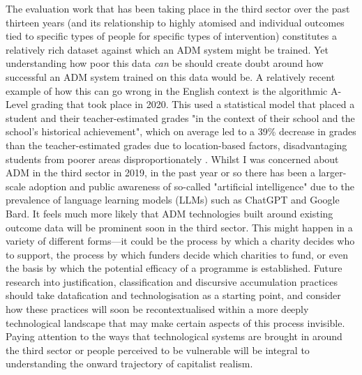 The evaluation work that has been taking place in the third sector over the past thirteen years (and its relationship to highly atomised and individual outcomes tied to specific types of people for specific types of intervention) constitutes a relatively rich dataset against which an ADM system might be trained. Yet understanding how poor this data \textit{can} be should create doubt around how successful an ADM system trained on this data would be. A relatively recent example of how this can go wrong in the English context is the algorithmic A-Level grading that took place in 2020. This used a statistical model that placed a student and their teacher-estimated grades "in the context of their school and the school’s historical achievement", which on average led to a 39\% decrease in grades than the teacher-estimated grades due to location-based factors, disadvantaging students from poorer areas disproportionately \citep[p. 608]{mead_contested_2023}. Whilst I was concerned about ADM in the third sector in 2019, in the past year or so there has been a larger-scale adoption and public awareness of so-called "artificial intelligence" due to the prevalence of language learning models (LLMs) such as ChatGPT and Google Bard. It feels much more likely that ADM technologies built around existing outcome data will be prominent soon in the third sector. This might happen in a variety of different forms—it could be the process by which a charity decides who to support, the process by which funders decide which charities to fund, or even the basis by which the potential efficacy of a programme is established. Future research into justification, classification and discursive accumulation practices should take datafication and technologisation as a starting point, and consider how these practices will soon be recontextualised within a more deeply technological landscape that may make certain aspects of this process invisible. Paying attention to the ways that technological systems are brought in around the third sector or people perceived to be vulnerable will be integral to understanding the onward trajectory of capitalist realism.

